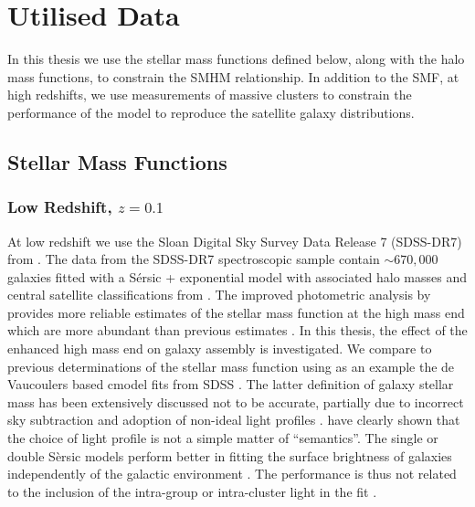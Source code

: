 \section{Utilised Data}

In this thesis we use the stellar mass functions defined below, along with the halo mass functions, to constrain the SMHM relationship. In addition to the SMF, at high redshifts, we use measurements of massive clusters to constrain the performance of the model to reproduce the satellite galaxy distributions.

\subsection{Stellar Mass Functions}
\label{subsec:SMF}

\subsubsection{Low Redshift, $z = 0.1$}
\label{subsub:SDSS}
At low redshift we use the Sloan Digital Sky Survey Data Release 7 (SDSS-DR7) from \citet{Meert2015ASystematics}.
The data from the SDSS-DR7 spectroscopic sample \citep{Abazajian2009THESURVEY} contain $\sim 670,000$ galaxies fitted with a S\'ersic + exponential model \citep[PyMorph;][]{Meert2015ASystematics} with associated halo masses and central satellite classifications from \citep{Yang2012EvolutionHalos}. The improved photometric analysis by \citet{Meert2015ASystematics} provides more reliable estimates of the stellar mass function at the high mass end which are more abundant than previous estimates \citep{Bernardi2016TheEvolution, Bernardi2017ComparingLight}.
In this thesis, the effect of the enhanced high mass end on galaxy assembly is investigated. We compare to previous determinations of the stellar mass function using as an example the de Vaucoulers \citep{deVaucouleurs1948RecherchesExtragalactiques} based cmodel fits from SDSS \citep{Abazajian2009THESURVEY}. The latter definition of galaxy stellar mass has been extensively discussed not to be accurate, partially due to incorrect sky subtraction and adoption of non-ideal light profiles \citep{Bernardi2013TheProfile}. \citet{Bernardi2017ComparingLight} have clearly shown that the choice of light profile is not a simple matter of ``semantics''. The single or double S\`ersic models perform better in fitting the surface brightness of galaxies independently of the galactic environment \citep{Meert2015ASystematics}. The performance is thus not related to the inclusion of the intra-group or intra-cluster light in the fit \citep{Bernardi2017ComparingLight}.

